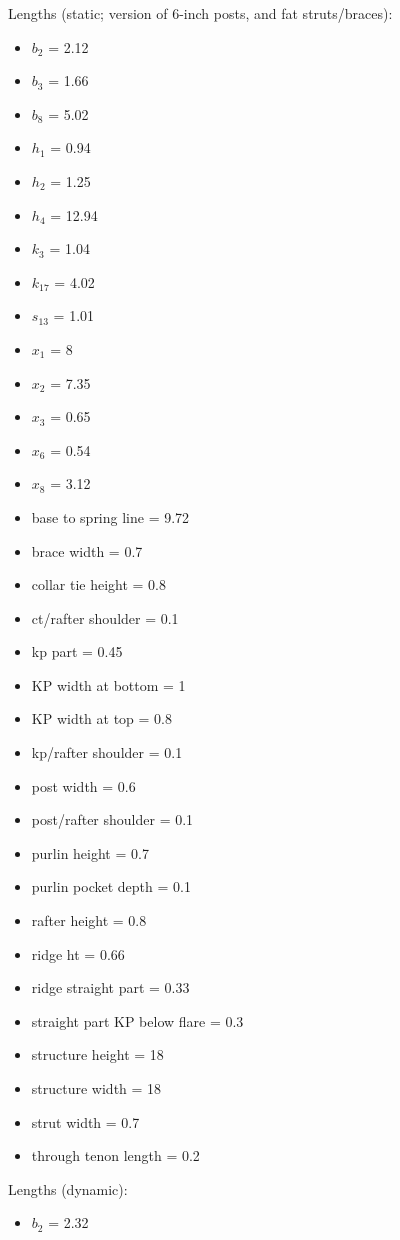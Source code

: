 \documentclass{article}\usepackage[]{graphicx}\usepackage[]{xcolor}
\begin{document}
\begin{multicols}{2}
Lengths (static; version of 6-inch posts, and fat struts/braces):
\begin{itemize}
  \item $b_2$ = 2.12
  \item $b_3$ = 1.66
  \item $b_8$ = 5.02
  \item $h_1$ = 0.94
  \item $h_2$ = 1.25
  \item $h_4$ = 12.94
  \item $k_3$ = 1.04
  \item $k_{17}$ = 4.02
  \item $s_{13}$ = 1.01
  \item $x_1$ = 8
  \item $x_2$ = 7.35
  \item $x_3$ = 0.65
  \item $x_6$ = 0.54
  \item $x_8$ = 3.12
  \item base to spring line = 9.72
  \item brace width = 0.7
  \item collar tie height = 0.8
  \item ct/rafter shoulder = 0.1
  \item kp part = 0.45
  \item KP width at bottom = 1
  \item KP width at top = 0.8
  \item kp/rafter shoulder = 0.1
  \item post width = 0.6
  \item post/rafter shoulder = 0.1
  \item purlin height = 0.7
  \item purlin pocket depth = 0.1
  \item rafter height = 0.8
  \item ridge ht = 0.66
  \item ridge straight part = 0.33
  \item straight part KP below flare = 0.3
  \item structure height = 18
  \item structure width = 18
  \item strut width = 0.7
  \item through tenon length = 0.2
\end{itemize}
\columnbreak
Lengths (dynamic):
\begin{itemize}
  \item $b_2$ = 2.32

\end{itemize}
\end{multicols}
\end{document}
